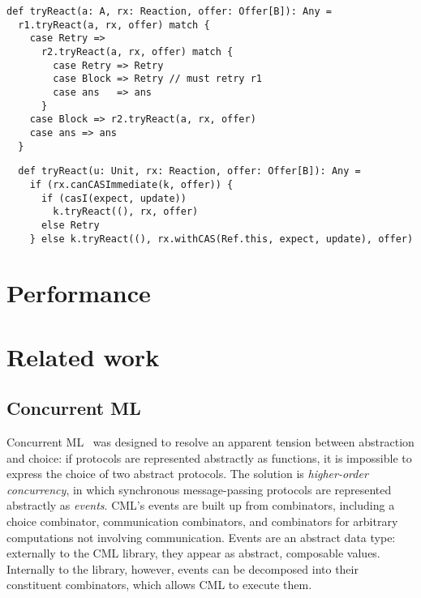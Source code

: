 \documentclass[preprint]{sigplanconf}
\begin{document}
\begin{lstlisting}
def tryReact(a: A, rx: Reaction, offer: Offer[B]): Any = 
  r1.tryReact(a, rx, offer) match {
    case Retry => 
      r2.tryReact(a, rx, offer) match {
        case Retry => Retry
        case Block => Retry // must retry r1
        case ans   => ans
      }
    case Block => r2.tryReact(a, rx, offer)
    case ans => ans
  }
\end{lstlisting}

\begin{lstlisting}
  def tryReact(u: Unit, rx: Reaction, offer: Offer[B]): Any = 
    if (rx.canCASImmediate(k, offer)) {
      if (casI(expect, update))
        k.tryReact((), rx, offer)
      else Retry
    } else k.tryReact((), rx.withCAS(Ref.this, expect, update), offer)
\end{lstlisting}

\section{Performance}
\label{sec:performance}


\newpage
\section{Related work}
\label{sec:related}


\subsection{Concurrent ML}

Concurrent ML~\cite{Reppy1991} was designed to resolve an apparent tension
between abstraction and choice: if protocols are represented abstractly as
functions, it is impossible to express the choice of two abstract protocols.
The solution is \emph{higher-order concurrency}, in which synchronous
message-passing protocols are represented abstractly as \emph{events}.  CML's
events are built up from combinators, including a choice combinator,
communication combinators, and combinators for arbitrary computations not
involving communication.  Events are an abstract data type: externally to the
CML library, they appear as abstract, composable values.  Internally to the
library, however, events can be decomposed into their constituent combinators,
which allows CML to execute them.
\end{document}
